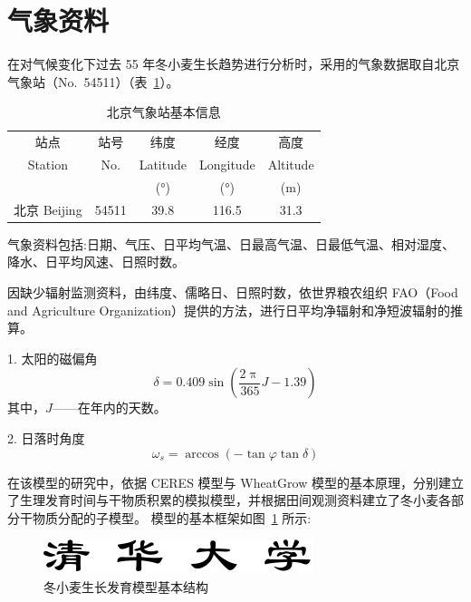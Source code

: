 \documentclass[degree=bachelor]{thuthesis}
\begin{document}
\section{气象资料}

在对气候变化下过去 55 年冬小麦生长趋势进行分析时，采用的气象数据取自北京气象站（No.~54511）（表~\ref{tab:beijing}）。

\begin{table}[htb]
  \centering
  \caption{北京气象站基本信息}
  \label{tab:beijing}
  \begin{tabular}{ccccc}
    \toprule
    站点 & 站号 & 纬度 & 经度 & 高度 \\
    Station & No. & Latitude & Longitude & Altitude \\
    && (°) & (°) & (m) \\
    \midrule
    北京 Beijing & 54511 & 39.8 & 116.5 & 31.3 \\
    \bottomrule
  \end{tabular}
\end{table}

气象资料包括:日期、气压、日平均气温、日最高气温、日最低气温、相对湿度、降水、日平均风速、日照时数。

因缺少辐射监测资料，由纬度、儒略日、日照时数，依世界粮农组织 FAO（Food and Agriculture Organization）提供的方法，进行日平均净辐射和净短波辐射的推算。

1. 太阳的磁偏角
\begin{equation}
  \delta = 0.409 \sin \left( \frac{2\uppi}{365} J - 1.39 \right)
\end{equation}
其中，$J$——在年内的天数。

2. 日落时角度
\begin{equation}
  \omega_s =\arccos\left( -\tan\varphi \tan\delta \right)
\end{equation}

\newpage

在该模型的研究中，依据 CERES 模型与 WheatGrow 模型的基本原理，分别建立了生理发育时间与干物质积累的模拟模型，并根据田间观测资料建立了冬小麦各部分干物质分配的子模型。
模型的基本框架如图~\ref{fig:winter} 所示:

\begin{figure}[htb]
  \centering
  \includegraphics{tsinghua-name-bachelor.pdf}
  \caption{冬小麦生长发育模型基本结构}
  \label{fig:winter}
\end{figure}
\end{document}
